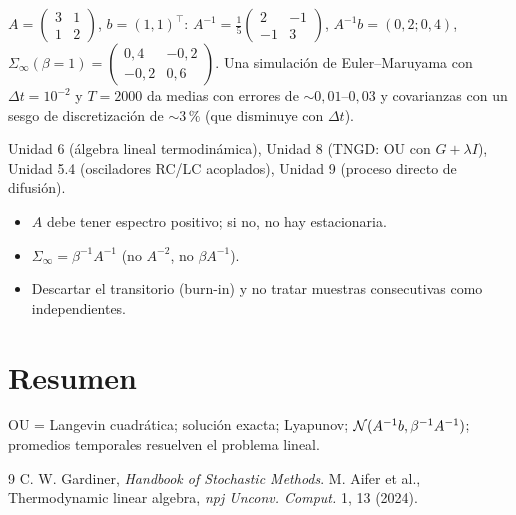 \documentclass[11pt,a4paper]{article}
\begin{document}
\begin{ejemplo}
$A=\begin{pmatrix}3&1\\1&2\end{pmatrix}$, $b=(1,1)^\top$: $A^{-1}=\frac15\begin{pmatrix}2&-1\\-1&3\end{pmatrix}$, $A^{-1}b=(0{,}2;0{,}4)$,
$\Sigma_\infty(\beta=1)=\begin{pmatrix}0{,}4&-0{,}2\\-0{,}2&0{,}6\end{pmatrix}$. Una simulación de Euler--Maruyama \evS{} con
$\Delta t=10^{-2}$ y $T=2000$ da medias con errores de $\sim0{,}01$--$0{,}03$ y covarianzas con un sesgo de discretización de
$\sim3\,\%$ (que disminuye con $\Delta t$).
\end{ejemplo}

\begin{aplicacion}
Unidad 6 (álgebra lineal termodinámica), Unidad 8 (TNGD: OU con $G+\lambda I$), Unidad 5.4 (osciladores RC/LC acoplados),
Unidad 9 (proceso directo de difusión).
\end{aplicacion}

\begin{error}
\begin{itemize}[nosep]
\item $A$ debe tener espectro positivo; si no, no hay estacionaria.
\item $\Sigma_\infty=\beta^{-1}A^{-1}$ (no $A^{-2}$, no $\beta A^{-1}$).
\item Descartar el transitorio (burn-in) y no tratar muestras consecutivas como independientes.
\end{itemize}
\end{error}

\section{Resumen}
OU = Langevin cuadrática; solución exacta; Lyapunov; $\mathcal{N}(A^{-1}b,\beta^{-1}A^{-1})$; promedios temporales resuelven el problema lineal.

\begin{thebibliography}{9}\small
{} C. W. Gardiner, \emph{Handbook of Stochastic Methods}.
 M. Aifer et al., Thermodynamic linear algebra, \emph{npj Unconv. Comput.} 1, 13 (2024).
\end{thebibliography}
\end{document}
